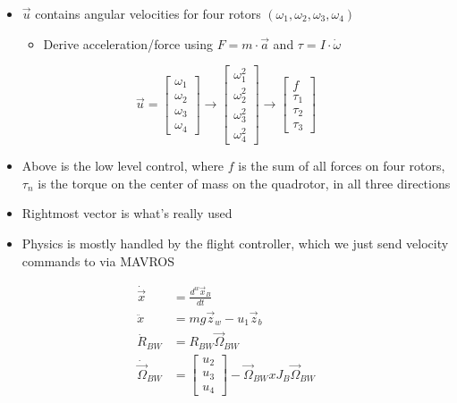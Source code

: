 \documentclass{article}
\begin{document}
\begin{itemize}
\item $\vec{u}$ contains angular velocities for four rotors $(\omega_1, \omega_2, \omega_3, \omega_4)$
    \begin{itemize}
    \item Derive acceleration/force using $F=m\cdot\vec{a}$ and $\tau=I\cdot\dot{\omega}$
    
    \end{itemize}
   \end{itemize}
   
  \begin{equation*}
    \vec{u}=
    \begin{bmatrix}
    \omega_1\\\omega_2\\\omega_3\\\omega_4
    \end{bmatrix}\rightarrow
    \begin{bmatrix}
    \omega_1^2\\\omega_2^2\\\omega_3^2\\\omega_4^2
    \end{bmatrix}\rightarrow
    \begin{bmatrix}
    f\\\tau_1\\\tau_2\\\tau_3
    \end{bmatrix}
    \end{equation*}
    \begin{itemize}
    \item Above is the low level control, where $f$ is the sum of all forces on four rotors, $\tau_n$ is the torque on the center of mass on the quadrotor, in all three directions
    \item Rightmost vector is what's really used
    \item Physics is mostly handled by the flight controller, which we just send velocity commands to via MAVROS
    \end{itemize}
\begin{equation*}
\begin{split}
\dot{\vec{x}}&=\frac{d^w\vec{x}_B}{dt}\\
\ddot{x}&=mg\vec{z}_w-u_1\vec{z}_b\\
\dot{R}_{BW}&=R_{BW}\vec{\Omega}_{BW}\\
\dot{\vec{\Omega}}_{BW}&=\begin{bmatrix}
u_2\\u_3\\u_4
\end{bmatrix}-\vec{\Omega}_{BW}xJ_B\vec{\Omega}_{BW}
\end{split}
\end{equation*}
\end{document}
